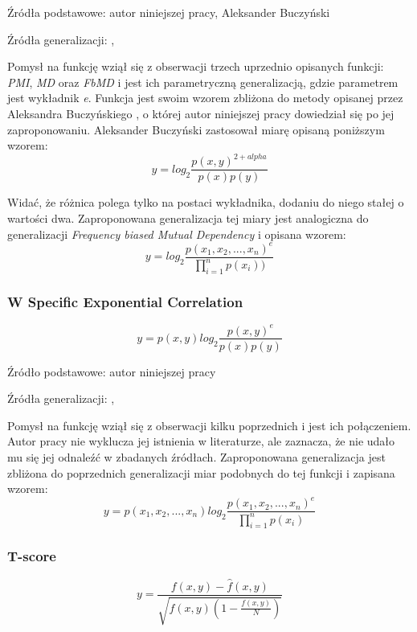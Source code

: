 Źródła podstawowe: autor niniejszej pracy, Aleksander Buczyński \cite{buczynski} 
\par
Źródła generalizacji: \cite{generalization_patterns}, \cite[str. 2]{mmi_w11}
\par
Pomysł na funkcję wziął się z obserwacji trzech uprzednio opisanych funkcji: \emph{PMI}, \emph{MD} oraz \emph{FbMD} i jest ich parametryczną generalizacją, gdzie parametrem jest wykładnik \emph{e}.
Funkcja jest swoim wzorem zbliżona do metody opisanej przez Aleksandra Buczyńskiego \cite{buczynski}, o której autor niniejszej pracy dowiedział się po jej zaproponowaniu.
Aleksander Buczyński zastosował miarę opisaną poniższym wzorem:
$$ y = log_{2}\frac{p(x, y)^{2 + alpha}}{p(x)p(y)} $$

Widać, że różnica polega tylko na postaci wykładnika, dodaniu do niego stałej o wartości dwa.
Zaproponowana generalizacja tej miary jest analogiczna do generalizacji \emph{Frequency biased Mutual Dependency} i opisana wzorem:
$$ y = log_{2}\frac{p(x_{1}, x_{2}, ..., x_{n})^{e}}{\prod_{i = 1}^{n} p(x_{i}))} $$

\subsubsection{W Specific Exponential Correlation}
$$ y = p(x, y) log_{2}\frac{p(x, y)^{e}}{p(x)p(y)} $$

Źródło podstawowe: autor niniejszej pracy
\par
Źródła generalizacji: \cite{generalization_patterns}, \cite[str. 2]{mmi_w11} 
\par
Pomysł na funkcję wziął się z obserwacji kilku poprzednich i jest ich połączeniem.
Autor pracy nie wyklucza jej istnienia w literaturze, ale zaznacza, że nie udało mu się jej odnaleźć w zbadanych źródłach.
Zaproponowana generalizacja jest zbliżona do poprzednich generalizacji miar podobnych do tej funkcji i zapisana wzorem:
$$ y = p(x_{1}, x_{2}, ..., x_{n}) log_{2}\frac{p(x_{1}, x_{2}, ..., x_{n})^{e}}{\prod_{i = 1}^{n} p(x_{i})} $$
	
\subsubsection{T-score}
$$ y = \frac{ f(x, y) - \hat{f}(x, y) }{ \sqrt{ f(x, y)(1 - \frac{f(x, y)}{N}) } } $$

